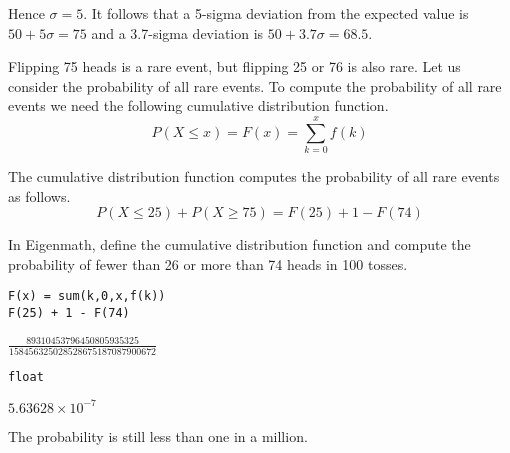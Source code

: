 Hence $\sigma=5$.
It follows that a 5-sigma deviation from the expected value is
$50+5\sigma=75$ and a
3.7-sigma deviation is $50+3.7\sigma=68.5$.

\bigskip
Flipping 75 heads is a rare event, but flipping 25 or 76 is also rare.
Let us consider the probability of all rare events.
To compute the probability of all rare events we need the following cumulative distribution function.
\begin{equation*}
P(X\le x)=F(x)=\sum_{k=0}^xf(k)
\end{equation*}

The cumulative distribution function computes the probability of all
rare events as follows.
\begin{equation*}
P(X\le25)+P(X\ge75)=F(25)+1-F(74)
\end{equation*}

In Eigenmath, define the cumulative distribution function and compute
the probability
of fewer than 26 or more than 74 heads in 100 tosses.

{\color{blue}
\begin{verbatim}
F(x) = sum(k,0,x,f(k))
F(25) + 1 - F(74)
\end{verbatim}}

$\frac{89310453796450805935325}{158456325028528675187087900672}$

{\color{blue}
\begin{verbatim}
float
\end{verbatim}}

$5.63628\times10^{-7}$

\bigskip
The probability is still less than one in a million.


